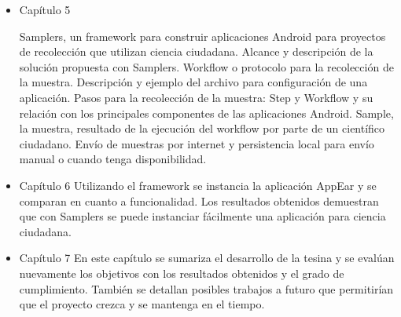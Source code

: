 \begin{itemize}
	\item{Capítulo 5} 
		
		Samplers, un framework para construir aplicaciones Android para proyectos de recolección que utilizan ciencia ciudadana. Alcance y descripción de la solución propuesta con Samplers. Workflow o protocolo para la recolección de la muestra. Descripción y ejemplo del archivo para configuración de una aplicación. Pasos para la recolección de la muestra: Step y Workflow y su relación con los principales componentes de las aplicaciones Android. Sample, la muestra, resultado de la ejecución del workflow por parte de un científico ciudadano. Envío de muestras por internet y persistencia local para envío manual o cuando tenga disponibilidad.
		
		
	\item{Capítulo 6} 
		Utilizando el framework se instancia la aplicación AppEar y se comparan en cuanto a funcionalidad. Los resultados obtenidos demuestran que con Samplers se puede instanciar fácilmente una aplicación para ciencia ciudadana.
		
		
	\item{Capítulo 7} 
		En este capítulo se sumariza el desarrollo de la tesina y se evalúan nuevamente los objetivos con los resultados obtenidos y el grado de cumplimiento. También se detallan posibles trabajos a futuro que permitirían que el proyecto crezca y se mantenga en el tiempo.		
						
\end{itemize}


			